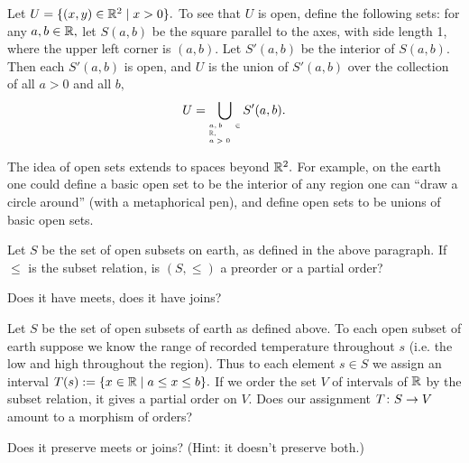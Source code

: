 \documentclass[CT4S-EN-RU]{subfiles}
\begin{document}
\begin{blockRUS}
\end{blockRUS}

\begin{exampleENG}
Let $U=\{(x,y)\in{\mathbb R}^2{\;|\;}x>0\}.$ To see that $U$ is open, define the following sets: for any $a,b\in{\mathbb R},$ let $S(a,b)$ be the square parallel to the axes, with side length 1, where the upper left corner is $(a,b).$ Let $S'(a,b)$ be the interior of $S(a,b).$ Then each $S'(a,b)$ is open, and $U$ is the union of $S'(a,b)$ over the collection of all $a>0$ and all $b,$$$U=\bigcup_{\parbox{.35in}{\tiny$a,b\in\RR,\\~\;\;a>0$}}S'(a,b).$$ 
\end{exampleENG}

\begin{exampleRUS}
\end{exampleRUS}

\begin{blockENG}
The idea of open sets extends to spaces beyond ${\mathbb R}^2.$ For example, on the earth one could define a basic open set to be the interior of any region one can “draw a circle around” (with a metaphorical pen), and define open sets to be unions of basic open sets. 
\end{blockENG}

\begin{blockRUS}
\end{blockRUS}

\begin{exerciseENG}
Let $S$ be the set of open subsets on earth, as defined in the above paragraph. 
\sexc If $\leq$ is the subset relation, is $(S,\leq)$ a preorder or a partial order? 
\item Does it have meets, does it have joins?
\endsexc
\end{exerciseENG}

\begin{exerciseRUS}
\end{exerciseRUS}

\begin{exerciseENG}\label{exc:cosheaf of temps}
Let $S$ be the set of open subsets of earth as defined above. To each open subset of earth suppose we know the range of recorded temperature throughout $s$ (i.e. the low and high throughout the region). Thus to each element $s\in S$ we assign an interval $T(s):=\{x\in{\mathbb R}{\;|\;}a\leq x\leq b\}.$ If we order the set $V$ of intervals of ${\mathbb R}$ by the subset relation, it gives a partial order on $V.$ 
\sexc Does our assignment $T\colon S\rightarrow V$ amount to a morphism of orders? 
\item Does it preserve meets or joins? (Hint: it doesn't preserve both.)
\endsexc
\end{exerciseENG}
\end{document}
